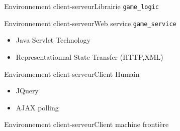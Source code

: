 \begin{frame}{Environnement client-serveur}{Librairie \texttt{game\_logic}}

\end{frame}

\begin{frame}{Environnement client-serveur}{Web service \texttt{game\_service}}
\begin{itemize}
\item Java Servlet Technology
\item Representationnal State Transfer (HTTP,XML)
\end{itemize}
\end{frame}

\begin{frame}{Environnement client-serveur}{Client Humain}
\begin{itemize}
\item JQuery
\item AJAX polling
\end{itemize}
\end{frame}

\begin{frame}{Environnement client-serveur}{Client machine frontière}

\end{frame}



